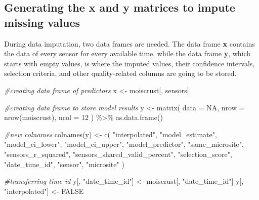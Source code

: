 \documentclass[
  table]{article}
\newenvironment{Shaded}{\begin{snugshade}}{\end{snugshade}}
\newcommand{\AttributeTok}[1]{\textcolor[rgb]{0.77,0.63,0.00}{#1}}
\newcommand{\CommentTok}[1]{\textcolor[rgb]{0.56,0.35,0.01}{\textit{#1}}}
\newcommand{\ConstantTok}[1]{\textcolor[rgb]{0.00,0.00,0.00}{#1}}
\newcommand{\DecValTok}[1]{\textcolor[rgb]{0.00,0.00,0.81}{#1}}
\newcommand{\FunctionTok}[1]{\textcolor[rgb]{0.00,0.00,0.00}{#1}}
\newcommand{\NormalTok}[1]{#1}
\newcommand{\OtherTok}[1]{\textcolor[rgb]{0.56,0.35,0.01}{#1}}
\newcommand{\SpecialCharTok}[1]{\textcolor[rgb]{0.00,0.00,0.00}{#1}}
\newcommand{\StringTok}[1]{\textcolor[rgb]{0.31,0.60,0.02}{#1}}
\begin{document}
\hypertarget{generating-the-x-and-y-matrices-to-impute-missing-values}{%
\subsection{Generating the x and y matrices to impute missing
values}\label{generating-the-x-and-y-matrices-to-impute-missing-values}}

During data imputation, two data frames are needed. The data frame
\textbf{x} contains the data of every sensor for every available time,
while the data frame \textbf{y}, which starts with empty values, is
where the imputed values, their confidence intervals, selection
criteria, and other quality-related columns are going to be stored.

\begin{Shaded}
\begin{Highlighting}[]
\CommentTok{\#creating data frame of predictors}
\NormalTok{x }\OtherTok{\textless{}{-}}\NormalTok{ moiscrust[, sensors]}

\CommentTok{\#creating data frame to store model results}
\NormalTok{y }\OtherTok{\textless{}{-}} \FunctionTok{matrix}\NormalTok{(}
  \AttributeTok{data =} \ConstantTok{NA}\NormalTok{, }
  \AttributeTok{nrow =} \FunctionTok{nrow}\NormalTok{(moiscrust), }
  \AttributeTok{ncol =} \DecValTok{12}
\NormalTok{  ) }\SpecialCharTok{\%\textgreater{}\%} 
  \FunctionTok{as.data.frame}\NormalTok{()}

\CommentTok{\#new colnames}
\FunctionTok{colnames}\NormalTok{(y) }\OtherTok{\textless{}{-}} \FunctionTok{c}\NormalTok{(}
  \StringTok{"interpolated"}\NormalTok{,}
  \StringTok{"model\_estimate"}\NormalTok{, }
  \StringTok{"model\_ci\_lower"}\NormalTok{, }
  \StringTok{"model\_ci\_upper"}\NormalTok{, }
  \StringTok{"model\_predictor"}\NormalTok{,}
  \StringTok{"same\_microsite"}\NormalTok{,}
  \StringTok{"sensors\_r\_squared"}\NormalTok{,}
  \StringTok{"sensors\_shared\_valid\_percent"}\NormalTok{,}
  \StringTok{"selection\_score"}\NormalTok{,}
  \StringTok{"date\_time\_id"}\NormalTok{,}
  \StringTok{"sensor"}\NormalTok{,}
  \StringTok{"microsite"}
\NormalTok{  )}

\CommentTok{\#transferring time id}
\NormalTok{y[, }\StringTok{"date\_time\_id"}\NormalTok{] }\OtherTok{\textless{}{-}}\NormalTok{ moiscrust[, }\StringTok{"date\_time\_id"}\NormalTok{]}
\NormalTok{y[, }\StringTok{"interpolated"}\NormalTok{] }\OtherTok{\textless{}{-}} \ConstantTok{FALSE}
\end{Highlighting}
\end{Shaded}
\end{document}
